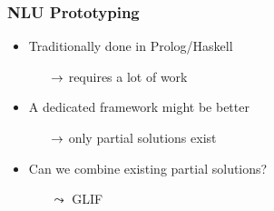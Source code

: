 \begin{frame}
    \frametitle{NLU Prototyping}
    \begin{itemize}
        \item Traditionally done in Prolog/Haskell
        \begin{itemize}
            \item[$\rightarrow$] requires a lot of work
        \end{itemize}
            \item A dedicated framework might be better
        \begin{itemize}
            \item[$\rightarrow$] only partial solutions exist
        \end{itemize}
        \item Can we combine existing partial solutions?
        \begin{itemize}
            \item[$\leadsto$] GLIF
        \end{itemize}
    \end{itemize}
\end{frame}

